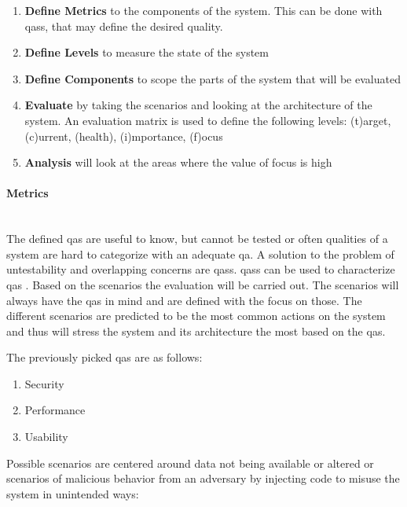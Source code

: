 \begin{enumerate}
    \item \textbf{Define Metrics} to the components of the system. This can be done with \glspl{qas}, that may define the desired quality.
    \item \textbf{Define Levels} to measure the state of the system
    \item \textbf{Define Components} to scope the parts of the system that will be evaluated
    \item \textbf{Evaluate} by taking the scenarios and looking at the architecture of the system. An evaluation matrix is used to define the following levels: (t)arget, (c)urrent, (health), (i)mportance, (f)ocus
    \item \textbf{Analysis} will look at the areas where the value of focus is high
\end{enumerate}

\vspace{0.5cm}
\paragraph{Metrics}\mbox{}\\

The defined \glspl{qa} are useful to know, but cannot be tested or often qualities of a system are hard to categorize with an adequate \gls{qa}. A solution to the problem of untestability and overlapping concerns are \glspl{qas}. \glspl{qas} can be used to characterize \glspl{qa} \cite{BassSoftwareArchitecture2003}. Based on the scenarios the evaluation will be carried out. The scenarios will always have the \glspl{qa} in mind and are defined with the focus on those. The different scenarios are predicted to be the most common actions on the system and thus will stress the system and its architecture the most based on the \glspl{qa}.

The previously picked \glspl{qa} are as follows:

\begin{enumerate}
    \item Security
    \item Performance
    \item Usability
\end{enumerate}

Possible scenarios are centered around data not being available or altered or scenarios of malicious behavior from an adversary by injecting code to misuse the system in unintended ways:


